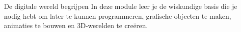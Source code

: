 
\ifdefined\HCode
\else
  \FVDmoduleopening
    {De digitale wereld begrijpen}
    {In deze module leer je de wiskundige basis die je nodig hebt om later te kunnen programmeren, grafische objecten te maken, animaties te bouwen en 3D-werelden te creëren.}
    {%
    }
\fi
